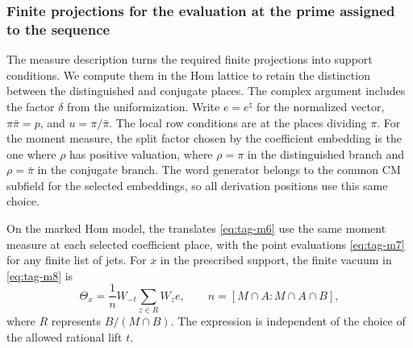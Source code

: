 \subsubsection{Finite projections for the evaluation at the prime assigned to the sequence}
\label{subsec:word-projection}

The measure description turns the required finite projections into support conditions. We compute them in the Hom lattice to retain the distinction between the distinguished and conjugate places. The complex argument includes the factor
\(\delta\) from the uniformization. Write \(e=e^\natural\)
for the normalized vector, \(\pi\bar\pi=p\), and
\(u=\pi/\bar\pi\). The local row conditions are at the
places dividing \(\pi\). For the moment measure, the
split factor chosen by the coefficient embedding is the
one where \(\rho\) has positive valuation, where
\(\rho=\pi\) in the distinguished branch and
\(\rho=\bar\pi\) in the conjugate branch. The word
generator belongs to the common CM subfield for the
selected embeddings, so all derivation positions use this
same choice.

\begin{proposition}\label{prop:word-reader-vacuum}
On the marked Hom model, the translates \textup{\eqref{eq:tag-m6}} use the
same moment measure at each selected coefficient place, with the point evaluations \textup{\eqref{eq:tag-m7}} for any finite list of jets.
For \(x\) in the prescribed support, the finite vacuum in \textup{\eqref{eq:tag-m8}} is
\[
 \Theta_x=\frac1n W_{-t}\sum_{z\in R}W_z e,\qquad n=[M\cap A:M\cap A\cap B],
\]
where \(R\) represents \(B/(M\cap B)\). The expression is independent of the
choice of the allowed rational lift \(t\).
\end{proposition}

